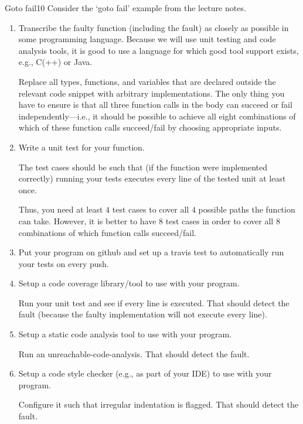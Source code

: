 \documentclass[a4paper]{article}
\begin{document}
\header

\begin{problem}{Goto fail}{10}
Consider the `goto fail' example from the lecture notes.

\begin{enumerate}
\item Transcribe the faulty function (including the fault) as closely as possible in some programming language.
Because we will use unit testing and code analysis tools, it is good to use a language for which good tool support exists, e.g., C(++) or Java.

Replace all types, functions, and variables that are declared outside the relevant code snippet with arbitrary implementations.
The only thing you have to ensure is that all three function calls in the body can succeed or fail independently---i.e., it should be possible to achieve all eight combinations of which of these function calls succeed/fail by choosing appropriate inputs.

\item Write a unit test for your function.

The test cases should be such that (if the function were implemented correctly) running your tests executes every line of the tested unit at least once.

Thus, you need at least $4$ test cases to cover all $4$ possible paths the function can take.
However, it is better to have $8$ test cases in order to cover all $8$ combinations of which function calls succeed/fail.

\item Put your program on github and set up a travis test to automatically run your tests on every push.

\item Setup a code coverage library/tool to use with your program.

Run your unit test and see if every line is executed.
That should detect the fault (because the faulty implementation will not execute every line).

\item Setup a static code analysis tool to use with your program.

Run an unreachable-code-analysis.
That should detect the fault.

\item Setup a code style checker (e.g., as part of your IDE) to use with your program.

Configure it such that irregular indentation is flagged.
That should detect the fault.
\end{enumerate}


\end{problem}
\end{document}
